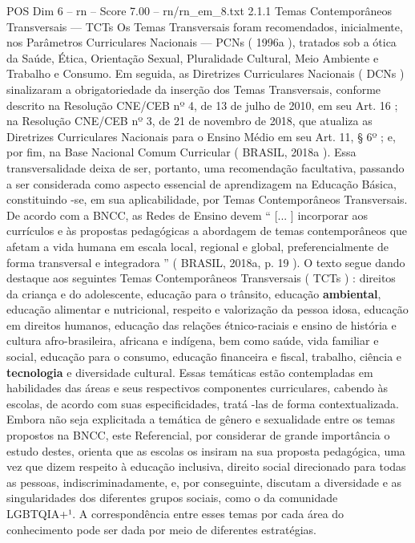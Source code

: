 \begin{textsample}{POS Dim 6 – rn – Score 7.00 – rn/rn\_em\_8.txt}  \label{ex:f6_pos_235}
2.1.1 Temas Contemporâneos Transversais — TCTs Os Temas Transversais foram recomendados, inicialmente, nos Parâmetros Curriculares Nacionais — PCNs ( 1996a ), tratados sob a ótica da Saúde, Ética, Orientação Sexual, Pluralidade Cultural, Meio Ambiente e Trabalho e Consumo.
Em seguida, as Diretrizes Curriculares Nacionais ( DCNs ) sinalizaram a obrigatoriedade da inserção dos Temas Transversais, conforme descrito na Resolução CNE/CEB nº 4, de 13 de julho de 2010, em seu Art. 16 ; na Resolução CNE/CEB nº 3, de 21 de novembro de 2018, que atualiza as Diretrizes Curriculares Nacionais para o Ensino Médio em seu Art. 11, § 6º ; e, por fim, na Base Nacional Comum Curricular ( BRASIL, 2018a ).
Essa transversalidade deixa de ser, portanto, uma recomendação facultativa, passando a ser considerada como aspecto essencial de aprendizagem na Educação Básica, constituindo -se, em sua aplicabilidade, por Temas Contemporâneos Transversais.
De acordo com a BNCC, as Redes de Ensino devem “ [... ] incorporar aos currículos e às propostas pedagógicas a abordagem de temas contemporâneos que afetam a vida humana em escala local, regional e global, preferencialmente de forma transversal e integradora ” ( BRASIL, 2018a, p. 19 ).
O texto segue dando destaque aos seguintes Temas Contemporâneos Transversais ( TCTs ) : direitos da criança e do adolescente, educação para o trânsito, educação \textbf{ambiental}, educação alimentar e nutricional, respeito e valorização da pessoa idosa, educação em direitos humanos, educação das relações étnico-raciais e ensino de história e cultura afro-brasileira, africana e indígena, bem como saúde, vida familiar e social, educação para o consumo, educação financeira e fiscal, trabalho, ciência e \textbf{tecnologia} e diversidade cultural.
Essas temáticas estão contempladas em habilidades das áreas e seus respectivos componentes curriculares, cabendo às escolas, de acordo com suas especificidades, tratá -las de forma contextualizada.
Embora não seja explicitada a temática de gênero e sexualidade entre os temas propostos na BNCC, este Referencial, por considerar de grande importância o estudo destes, orienta que as escolas os insiram na sua proposta pedagógica, uma vez que dizem respeito à educação inclusiva, direito social direcionado para todas as pessoas, indiscriminadamente, e, por conseguinte, discutam a diversidade e as singularidades dos diferentes grupos sociais, como o da comunidade LGBTQIA+¹.
A correspondência entre esses temas por cada área do conhecimento pode ser dada por meio de diferentes estratégias.

\end{textsample}
